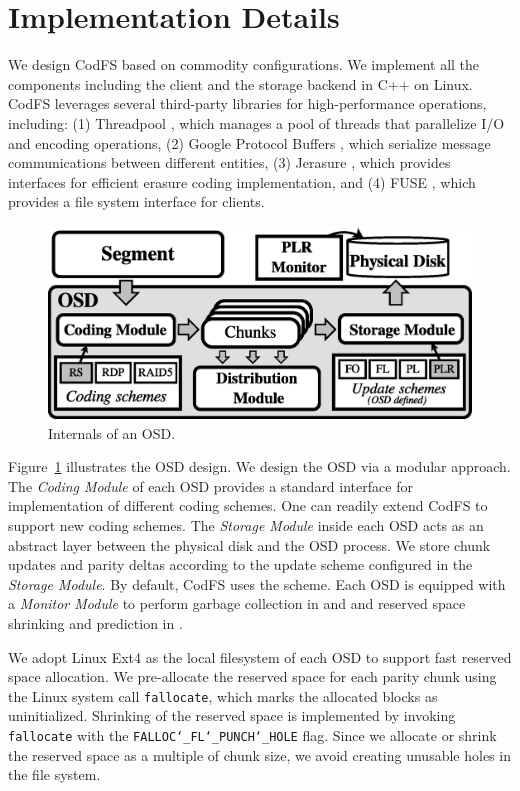 \section{Implementation Details}
\label{sec:implementation}

We design CodFS based on commodity configurations. We implement all the
components including the client and the storage backend in C++ on Linux.
CodFS leverages several third-party libraries for high-performance operations,
including: (1) Threadpool \cite{boosttp}, which manages a pool of threads that
parallelize I/O and encoding operations, (2) Google Protocol Buffers
\cite{protobuf}, which serialize message communications between different
entities, (3) Jerasure \cite{plank09}, which provides interfaces for
efficient erasure coding implementation, and (4) FUSE \cite{fuse}, which
provides a file system interface for clients.

\begin{figure}[t]
 \centering
 \includegraphics[width=0.9\linewidth]{figs/osd_implement}
 \vspace{-3pt}
 \caption{Internals of an OSD.}
 \label{fig:osd_implement}
\end{figure}

Figure~\ref{fig:osd_implement} illustrates the OSD design. 
We design the OSD via a modular approach. The \textit{Coding Module} of 
each OSD provides a standard interface for implementation of different coding
schemes.  One can readily extend CodFS to support new coding schemes.
The \textit{Storage Module} inside each OSD acts as an abstract layer between
the physical disk and the OSD process.  We store chunk updates and parity
deltas according to the update scheme configured in the \textit{Storage
Module}.  By default, CodFS uses the \PLR scheme. Each OSD is equipped with
a \textit{Monitor Module} to perform garbage collection in \FL and \PL and
reserved space shrinking and prediction in \PLR.

We adopt Linux Ext4 as the local filesystem of each OSD to support fast
reserved space allocation.  We pre-allocate the reserved space for each parity
chunk using the Linux system call \texttt{fallocate}, which marks the
allocated blocks as uninitialized. 
Shrinking of the reserved space is implemented by invoking \texttt{fallocate}
with the \texttt{FALLOC\char`_FL\char`_PUNCH\char`_HOLE} flag. Since we
allocate or shrink the reserved space as a multiple of chunk size, we avoid
creating unusable holes in the file system.

